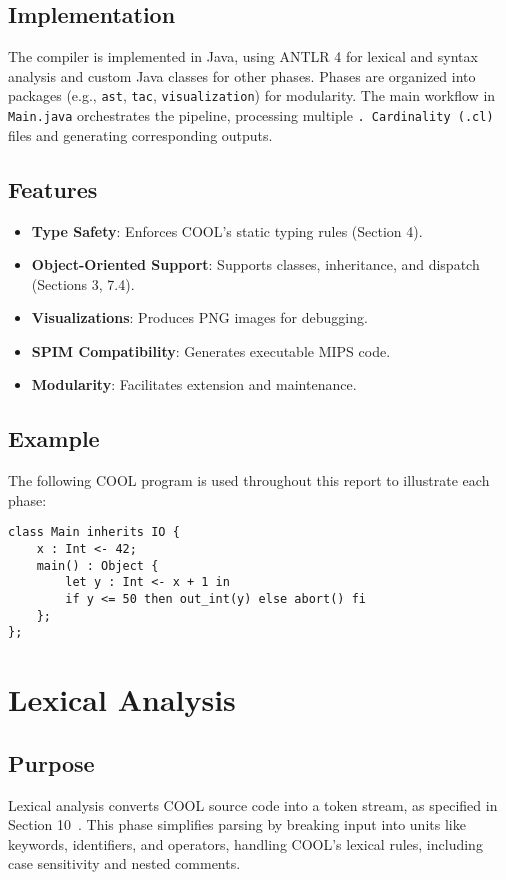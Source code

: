 \documentclass[11pt, titlepage]{article}
\begin{document}
\subsection{Implementation}
The compiler is implemented in Java, using ANTLR 4 for lexical and syntax analysis and custom Java classes for other phases. Phases are organized into packages (e.g., \texttt{ast}, \texttt{tac}, \texttt{visualization}) for modularity. The main workflow in \texttt{Main.java} orchestrates the pipeline, processing multiple \texttt{. Cardinality (.cl)} files and generating corresponding outputs.

\subsection{Features}
\begin{itemize}[leftmargin=*]
    \item \textbf{Type Safety}: Enforces COOL's static typing rules (Section 4).
    \item \textbf{Object-Oriented Support}: Supports classes, inheritance, and dispatch (Sections 3, 7.4).
    \item \textbf{Visualizations}: Produces PNG images for debugging.
    \item \textbf{SPIM Compatibility}: Generates executable MIPS code.
    \item \textbf{Modularity}: Facilitates extension and maintenance.
\end{itemize}

\subsection{Example}
The following COOL program is used throughout this report to illustrate each phase:
\begin{lstlisting}
class Main inherits IO {
    x : Int <- 42;
    main() : Object {
        let y : Int <- x + 1 in
        if y <= 50 then out_int(y) else abort() fi
    };
};
\end{lstlisting}

\section{Lexical Analysis}
\label{sec:lexical}

\subsection{Purpose}
Lexical analysis converts COOL source code into a token stream, as specified in Section 10~\cite{cool_manual}. This phase simplifies parsing by breaking input into units like keywords, identifiers, and operators, handling COOL's lexical rules, including case sensitivity and nested comments.
\end{document}
